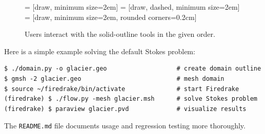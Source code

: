 \documentclass[letterpaper,final,12pt,reqno]{amsart}
\begin{document}
\begin{figure}[h]
\bigskip
{} = [draw, minimum size=2em]
 = [draw, dashed, minimum size=2em]
 = [draw, minimum size=2em, rounded corners=0.2cm]

\medskip
\caption{Users interact with the solid-outline tools in the given order.}
\label{fig:blockdiagram}
\end{figure}

Here is a simple example solving the default Stokes problem:

\medskip
\begin{Verbatim}
$ ./domain.py -o glacier.geo                   # create domain outline
$ gmsh -2 glacier.geo                          # mesh domain
$ source ~/firedrake/bin/activate              # start Firedrake
(firedrake) $ ./flow.py -mesh glacier.msh      # solve Stokes problem
(firedrake) $ paraview glacier.pvd             # visualize results
\end{Verbatim}

\medskip
\noindent The \verb|README.md| file documents usage and regression testing more thoroughly.


\small

\bigskip


\end{document}
